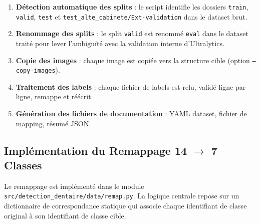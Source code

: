 \documentclass{rapportENSIAS}
\newcommand{\projectpath}[1]{\texttt{#1}}
\begin{document}
\begin{enumerate}
    \item \textbf{Détection automatique des splits} : le script identifie les
          dossiers \texttt{train}, \texttt{valid}, \texttt{test} et
          \texttt{test\_alte\_cabinete/Ext-validation} dans le dataset brut.
    \item \textbf{Renommage des splits} : le split \texttt{valid} est renommé
          \texttt{eval} dans le dataset traité pour lever l'ambiguïté avec la
          validation interne d'Ultralytics.
    \item \textbf{Copie des images} : chaque image est copiée vers la structure
          cible (option \texttt{--copy-images}).
    \item \textbf{Traitement des labels} : chaque fichier de labels est relu,
          validé ligne par ligne, remappe et réécrit.
    \item \textbf{Génération des fichiers de documentation} : YAML dataset,
          fichier de mapping, résumé JSON.
\end{enumerate}

\subsection{Implémentation du Remappage 14 $\rightarrow$ 7 Classes}

Le remappage est implémenté dans le module
\projectpath{src/detection\_dentaire/data/remap.py}.
La logique centrale repose sur un dictionnaire de correspondance statique qui
associe chaque identifiant de classe original à son identifiant de classe cible.
\end{document}
